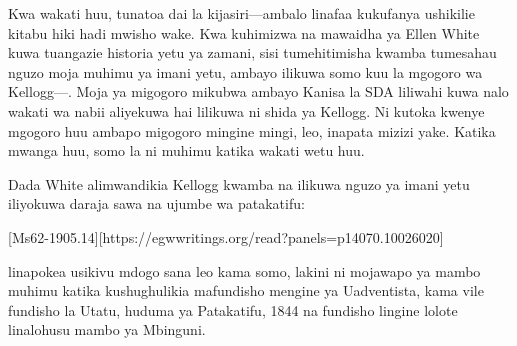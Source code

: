 Kwa wakati huu, tunatoa dai la kijasiri—ambalo linafaa kukufanya ushikilie kitabu hiki hadi mwisho wake. Kwa kuhimizwa na mawaidha ya Ellen White kuwa tuangazie historia yetu ya zamani, sisi tumehitimisha kwamba tumesahau nguzo moja muhimu ya imani yetu, ambayo ilikuwa somo kuu la mgogoro wa Kellogg—. Moja ya migogoro mikubwa ambayo Kanisa la SDA liliwahi kuwa nalo wakati wa nabii aliyekuwa hai lilikuwa ni shida ya Kellogg. Ni kutoka kwenye mgogoro huu ambapo migogoro mingine mingi, leo, inapata mizizi yake. Katika mwanga huu, somo la  ni muhimu katika wakati wetu huu.

Dada White alimwandikia Kellogg kwamba  na  ilikuwa nguzo ya imani yetu iliyokuwa daraja sawa na ujumbe wa patakatifu:

[Ms62-1905.14][https://egwwritings.org/read?panels=p14070.10026020]

 linapokea usikivu mdogo sana leo kama somo, lakini ni mojawapo ya mambo muhimu katika kushughulikia mafundisho mengine ya Uadventista, kama vile fundisho la Utatu, huduma ya Patakatifu, 1844 na fundisho lingine lolote linalohusu mambo ya Mbinguni.

